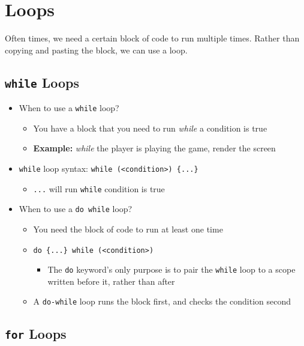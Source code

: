 \documentclass{article}
\begin{document}
\section{Loops}

\noindent
Often times, we need a certain block of code to run multiple times. Rather than copying and pasting the block, we can use a loop.

\subsection{\texttt{while} Loops}

\begin{itemize}
	\item When to use a \texttt{while} loop?
	\begin{itemize}
		\item You have a block that you need to run \textit{while} a condition is true
		\item \textbf{Example:} \textit{while} the player is playing the game, render the screen
	\end{itemize}
	\item \texttt{while} loop syntax: \texttt{while (<condition>) \{...\}}
	\begin{itemize}
		\item \texttt{...} will run \texttt{while} condition is true
	\end{itemize}
	
	\item When to use a \texttt{do while} loop?
	\begin{itemize}
		\item You need the block of code to run at least one time
		\item \texttt{do \{...\} while (<condition>)}
		\begin{itemize}\item The \texttt{do} keyword's only purpose is to pair the \texttt{while} loop to a scope written before it, rather than after
		\end{itemize}
		\item A \texttt{do-while} loop runs the block first, and checks the condition second
	\end{itemize}
	
\end{itemize}

\subsection{\texttt{for} Loops}
\end{document}
